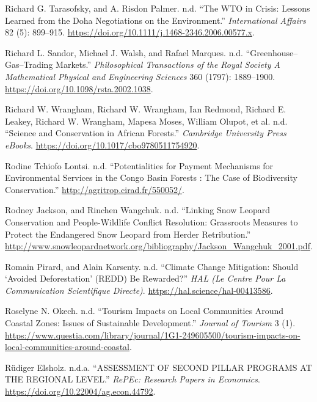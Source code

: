 \begin{CSLReferences}{1}{0}
Richard G. Tarasofsky, and A. Risdon Palmer. n.d. {``The WTO in Crisis:
Lessons Learned from the Doha Negotiations on the Environment.''}
\emph{International Affairs} 82 (5): 899--915.
\url{https://doi.org/10.1111/j.1468-2346.2006.00577.x}.

Richard L. Sandor, Michael J. Walsh, and Rafael Marques. n.d.
{``Greenhouse--Gas--Trading Markets.''} \emph{Philosophical Transactions
of the Royal Society A Mathematical Physical and Engineering Sciences}
360 (1797): 1889--1900. \url{https://doi.org/10.1098/rsta.2002.1038}.

Richard W. Wrangham, Richard W. Wrangham, Ian Redmond, Richard E.
Leakey, Richard W. Wrangham, Mapesa Moses, William Olupot, et al. n.d.
{``Science and Conservation in African Forests.''} \emph{Cambridge
University Press eBooks}.
\url{https://doi.org/10.1017/cbo9780511754920}.

Rodine Tchiofo Lontsi. n.d. {``Potentialities for Payment Mechanisms for
Environmental Services in the Congo Basin Forests : The Case of
Biodiversity Conservation.''} \url{http://agritrop.cirad.fr/550052/}.

Rodney Jackson, and Rinchen Wangchuk. n.d. {``Linking Snow Leopard
Conservation and People-Wildlife Conflict Resolution: Grassroots
Measures to Protect the Endangered Snow Leopard from Herder
Retribution.''}
\url{http://www.snowleopardnetwork.org/bibliography/Jackson_Wangchuk_2001.pdf}.

Romain Pirard, and Alain Karsenty. n.d. {``Climate Change Mitigation:
Should {`Avoided Deforestation'} (REDD) Be Rewarded?''} \emph{HAL (Le
Centre Pour La Communication Scientifique Directe)}.
\url{https://hal.science/hal-00413586}.

Roselyne N. Okech. n.d. {``Tourism Impacts on Local Communities Around
Coastal Zones: Issues of Sustainable Development.''} \emph{Journal of
Tourism} 3 (1).
\url{https://www.questia.com/library/journal/1G1-249605500/tourism-impacts-on-local-communities-around-coastal}.

Rüdiger Elsholz. n.d.a. {``ASSESSMENT OF SECOND PILLAR PROGRAMS AT THE
REGIONAL LEVEL.''} \emph{RePEc: Research Papers in Economics}.
\url{https://doi.org/10.22004/ag.econ.44792}.


\end{CSLReferences}

